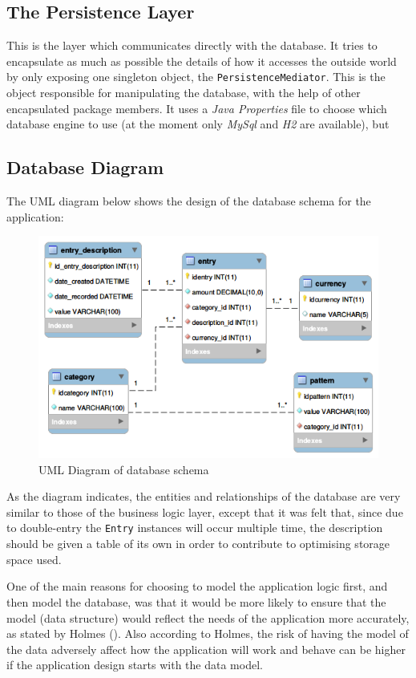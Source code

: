 \subsection{The Persistence Layer} \label{sec:AnalysisAndDesign.PersistenceLayer}
This is the layer which communicates directly with the database. It tries to
encapsulate as much as possible the details of how it accesses the outside
world by only exposing one singleton object, the \texttt{PersistenceMediator}.
This is the object responsible for manipulating the database, with the help of
other encapsulated package members. It uses a \emph{Java Properties} file to
choose which database engine to use (at the moment only \emph{MySql} and
\emph{H2} are available), but 

\subsection{Database Diagram} \label{sec:AnalysisAndDesign.PersistenceLayer}
The UML diagram below shows the design of the database schema for the
application:
\begin{figure}[ht!]
  \begin{center}
    \includegraphics[width=14cm]{./contents/img/Database_Diagram.png}
  \end{center}
  \caption{UML Diagram of database schema}
  \label{fig:ClassDiagram.AllClasses}
\end{figure}
\FloatBarrier

As the diagram indicates, the entities and relationships of the database are
very similar to those of the business logic layer, except that it was felt
that, since due to double-entry the \texttt{Entry} instances will occur
multiple time, the description should be given a table of its own in order to
contribute to optimising storage space used.

One of the main reasons for choosing to model the application logic first, and
then model the database, was that it would be more likely to ensure that the
model (data structure) would reflect the needs of the application more
accurately, as stated by Holmes (\citeyear[][p.~141]{holmes2018mean}). Also
according to Holmes, the risk of having the model of the data adversely affect
how the application will work and behave can be higher if the application
design starts with the data model.
